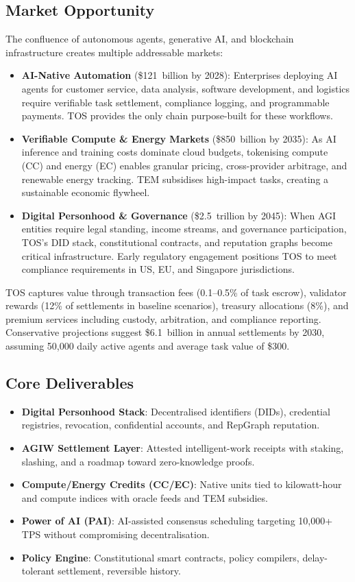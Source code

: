 \documentclass[11pt]{article}
\begin{document}
\subsection{Market Opportunity}
The confluence of autonomous agents, generative AI, and blockchain infrastructure creates multiple addressable markets:
\begin{itemize}[noitemsep]
  \item \textbf{AI-Native Automation} (\$121~billion by 2028): Enterprises deploying AI agents for customer service, data analysis, software development, and logistics require verifiable task settlement, compliance logging, and programmable payments. TOS provides the only chain purpose-built for these workflows.
  \item \textbf{Verifiable Compute \& Energy Markets} (\$850~billion by 2035): As AI inference and training costs dominate cloud budgets, tokenising compute (CC) and energy (EC) enables granular pricing, cross-provider arbitrage, and renewable energy tracking. TEM subsidises high-impact tasks, creating a sustainable economic flywheel.
  \item \textbf{Digital Personhood \& Governance} (\$2.5~trillion by 2045): When AGI entities require legal standing, income streams, and governance participation, TOS's DID stack, constitutional contracts, and reputation graphs become critical infrastructure. Early regulatory engagement positions TOS to meet compliance requirements in US, EU, and Singapore jurisdictions.
\end{itemize}

TOS captures value through transaction fees (0.1--0.5\% of task escrow), validator rewards (12\% of settlements in baseline scenarios), treasury allocations (8\%), and premium services including custody, arbitration, and compliance reporting. Conservative projections suggest \$6.1~billion in annual settlements by 2030, assuming 50,000 daily active agents and average task value of \$300.

\subsection{Core Deliverables}
\begin{itemize}[noitemsep]
  \item \textbf{Digital Personhood Stack}: Decentralised identifiers (DIDs), credential registries, revocation, confidential accounts, and RepGraph reputation.
  \item \textbf{AGIW Settlement Layer}: Attested intelligent-work receipts with staking, slashing, and a roadmap toward zero-knowledge proofs.
  \item \textbf{Compute/Energy Credits (CC/EC)}: Native units tied to kilowatt-hour and compute indices with oracle feeds and TEM subsidies.
  \item \textbf{Power of AI (PAI)}: AI-assisted consensus scheduling targeting 10,000+ TPS without compromising decentralisation.
  \item \textbf{Policy Engine}: Constitutional smart contracts, policy compilers, delay-tolerant settlement, reversible history.
\end{itemize}
\end{document}
